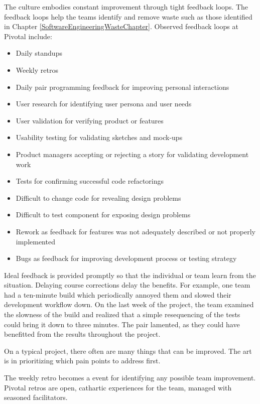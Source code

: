 The culture embodies constant improvement through tight feedback loops. The feedback loops help the teams identify and remove waste such as those identified in Chapter \ref{SoftwareEngineeringWasteChapter}. 
Observed feedback loops at Pivotal include:
\begin{itemize}
  \item Daily standups
  \item Weekly retros
  \item Daily pair programming feedback for improving personal interactions
  \item User research for identifying user persona and user needs
  \item User validation for verifying product or features
  \item Usability testing for validating sketches and mock-ups
  \item Product managers accepting or rejecting a story for validating development work
  \item Tests for confirming successful code refactorings 
  \item Difficult to change code for revealing design problems
  \item Difficult to test component for exposing design problems
  \item Rework as feedback for features was not adequately described or not properly implemented
  \item Bugs as feedback for improving development process or testing strategy 
\end{itemize}


Ideal feedback is provided promptly so that the individual or team learn from the situation. Delaying course corrections delay the benefits. For example, one team had a ten-minute build which periodically annoyed them and slowed their development workflow down. On the last week of the project, the team examined the slowness of the build and realized that a simple resequencing of the tests could bring it down to three minutes. The pair lamented,  as they could have benefitted from the results throughout the project. 


On a typical project, there often are many things that can be improved. The art is in prioritizing which pain points to address first.  


The weekly retro becomes a  event for identifying any possible team improvement. Pivotal retros are open, cathartic experiences for the team, managed with seasoned facilitators. 


